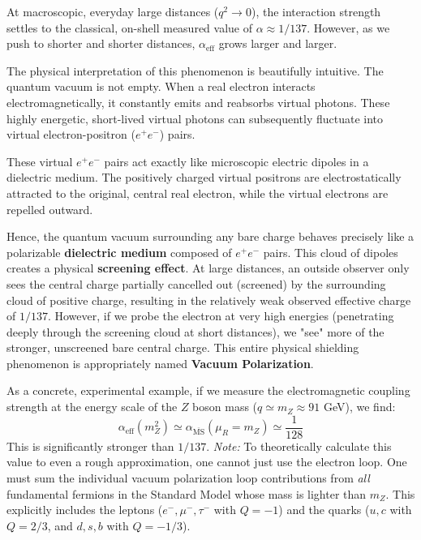 
At macroscopic, everyday large distances ($q^2 \to 0$), the interaction strength settles to the classical, on-shell measured value of $\alpha \approx 1/137$. However, as we push to shorter and shorter distances, $\alpha_{\text{eff}}$ grows larger and larger.

The physical interpretation of this phenomenon is beautifully intuitive. The quantum vacuum is not empty. When a real electron interacts electromagnetically, it constantly emits and reabsorbs virtual photons. These highly energetic, short-lived virtual photons can subsequently fluctuate into virtual electron-positron ($e^+e^-$) pairs.

These virtual $e^+e^-$ pairs act exactly like microscopic electric dipoles in a dielectric medium. The positively charged virtual positrons are electrostatically attracted to the original, central real electron, while the virtual electrons are repelled outward.


Hence, the quantum vacuum surrounding any bare charge behaves precisely like a polarizable \textbf{dielectric medium} composed of $e^+e^-$ pairs. This cloud of dipoles creates a physical \textbf{screening effect}. At large distances, an outside observer only sees the central charge partially cancelled out (screened) by the surrounding cloud of positive charge, resulting in the relatively weak observed effective charge of $1/137$. However, if we probe the electron at very high energies (penetrating deeply through the screening cloud at short distances), we "see" more of the stronger, unscreened bare central charge. This entire physical shielding phenomenon is appropriately named \textbf{Vacuum Polarization}.

As a concrete, experimental example, if we measure the electromagnetic coupling strength at the energy scale of the $Z$ boson mass ($q \simeq m_Z \approx 91$ GeV), we find:
\[ \alpha_{\text{eff}}(m_Z^2) \simeq \alpha_{\overline{\text{MS}}}(\mu_R = m_Z) \simeq \frac{1}{128} \]
This is significantly stronger than $1/137$.
\textit{Note:} To theoretically calculate this value to even a rough approximation, one cannot just use the electron loop. One must sum the individual vacuum polarization loop contributions from \textit{all} fundamental fermions in the Standard Model whose mass is lighter than $m_Z$. This explicitly includes the leptons ($e^-, \mu^-, \tau^-$ with $Q=-1$) and the quarks ($u, c$ with $Q=2/3$, and $d, s, b$ with $Q=-1/3$).

